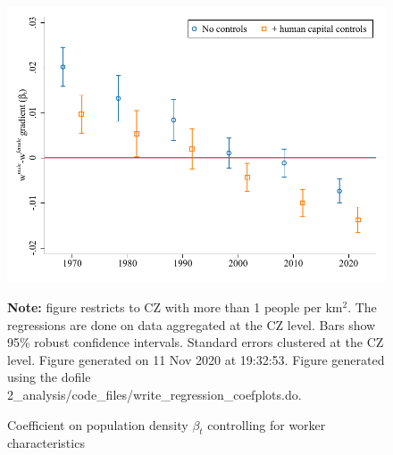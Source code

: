 \begin{figure}[!h]
\centering
\caption{Coefficient on population density $ \beta_t $ controlling for worker characteristics}
\includegraphics[width=1\textwidth]{../2_analysis/output/figures/with_control_gradients_individual_l_czone_density_full_time}
\par \begin{minipage}[h]{\textwidth}{\tiny\textbf{Note:} figure restricts to CZ with more than 1 people per km$^2$. The regressions are done on data aggregated at the CZ level. Bars show 95\% robust confidence intervals. Standard errors clustered at the CZ level. Figure generated on 11 Nov 2020 at 19:32:53. Figure generated using the dofile 2\_analysis/code\_files/write\_regression\_coefplots.do.}\end{minipage}
\end{figure}
